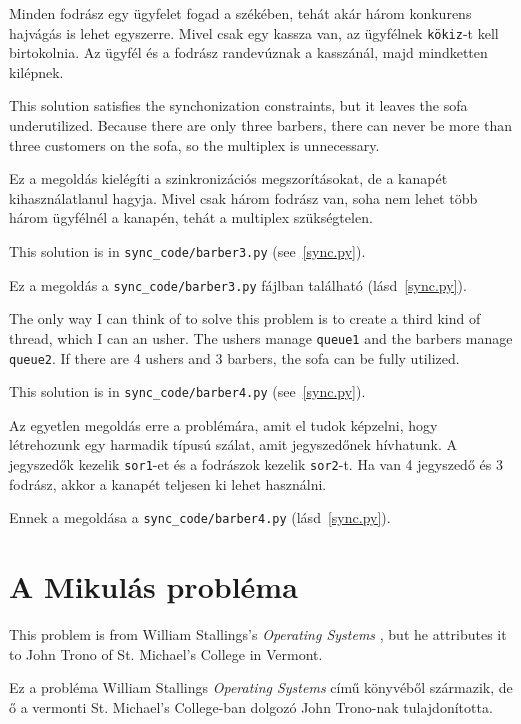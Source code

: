 \documentclass{book}
\newcommand{\clearemptydoublepage}{\newpage\cleardoublepage}
\begin{document}
Minden fodrász egy ügyfelet fogad a székében, tehát akár három konkurens
hajvágás is lehet egyszerre. Mivel csak egy kassza van, az ügyfélnek
{\tt kökiz}-t kell birtokolnia. Az ügyfél és a fodrász randevúznak a kasszánál,
majd mindketten kilépnek.

This solution satisfies the synchonization constraints, but it leaves
the sofa underutilized.  Because there are only three barbers, there
can never be more than three customers on the sofa, so the multiplex
is unnecessary.

Ez a megoldás kielégíti a szinkronizációs megszorításokat, de a kanapét
kihasználatlanul hagyja. Mivel csak három fodrász van, soha nem lehet több
három ügyfélnél a kanapén, tehát a multiplex szükségtelen.

This solution is in \verb"sync_code/barber3.py" (see~\ref{sync.py}).

Ez a megoldás a \verb"sync_code/barber3.py" fájlban található (lásd~\ref{sync.py}).

The only way I can think of to solve this problem is to create a third
kind of thread, which I can an usher.  The ushers manage {\tt queue1}
and the barbers manage {\tt queue2}.  If there are 4 ushers and 3 barbers,
the sofa can be fully utilized.

This solution is in \verb"sync_code/barber4.py" (see~\ref{sync.py}).

Az egyetlen megoldás erre a problémára, amit el tudok képzelni, hogy létrehozunk egy
harmadik típusú szálat, amit jegyszedőnek hívhatunk. A jegyszedők kezelik {\tt sor1}-et
és a fodrászok kezelik {\tt sor2}-t. Ha van 4 jegyszedő és 3 fodrász, akkor
a kanapét teljesen ki lehet használni.

Ennek a megoldása a \verb"sync_code/barber4.py" (lásd~\ref{sync.py}).
   
\clearemptydoublepage
\section{A Mikulás probléma}

This problem is from William Stallings's
{\em Operating Systems} \cite{stallings},
but he attributes it to John Trono of St. Michael's College in
Vermont.

Ez a probléma William Stallings {\em Operating Systems} \cite{stallings}
című könyvéből származik, de ő a vermonti St. Michael's College-ban dolgozó
John Trono-nak tulajdonította.
\end{document}
